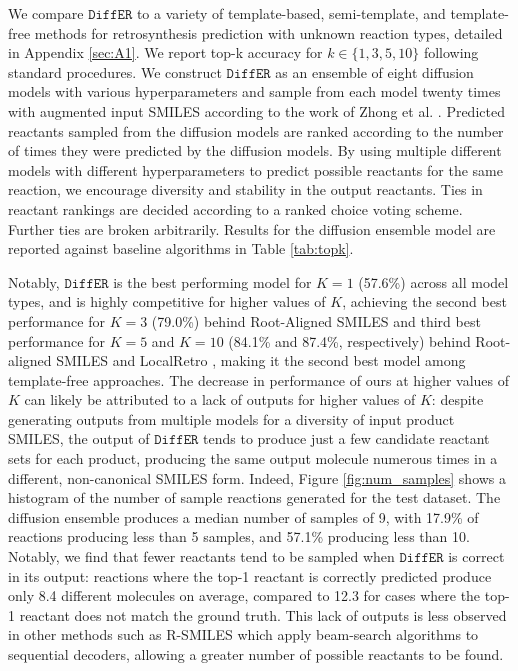 \documentclass{article}
\newcommand{\ours}{$\texttt{DiffER}$\xspace}
\begin{document}
We compare \ours to a variety of template-based, semi-template, and template-free methods for retrosynthesis prediction with unknown reaction types, detailed in Appendix \ref{sec:A1}. We report top-k accuracy for $k\in\{1,3,5,10\}$ following standard procedures. We construct \ours as an ensemble of eight diffusion models with various hyperparameters and sample from each model twenty times with augmented input SMILES according to the work of Zhong et al. \cite{zhong2022root}. Predicted reactants sampled from the diffusion models are ranked according to the number of times they were predicted by the diffusion models. By using multiple different models with different hyperparameters to predict possible reactants for the same reaction, we encourage diversity and stability in the output reactants. Ties in reactant rankings are decided according to a ranked choice voting scheme. Further ties are broken arbitrarily. Results for the diffusion ensemble model are reported against baseline algorithms in Table \ref{tab:topk}.

Notably, \ours is the best performing model for $K=1$ (57.6\%) across all model types, and is highly competitive for higher values of $K$, achieving the second best performance for $K=3$ (79.0\%) behind Root-Aligned SMILES \cite{zhong2022root} and third best performance for $K=5$ and $K=10$ (84.1\% and 87.4\%, respectively) behind Root-aligned SMILES and LocalRetro \cite{chen2021deep}, making it the second best model among template-free approaches. The decrease in performance of ours at higher values of $K$ can likely be attributed to a lack of outputs for higher values of $K$: despite generating outputs from multiple models for a diversity of input product SMILES, the output of \ours tends to produce just a few candidate reactant sets for each product, producing the same output molecule numerous times in a different, non-canonical SMILES form. Indeed, Figure \ref{fig:num_samples} shows a histogram of the number of sample reactions generated for the test dataset. The diffusion ensemble produces a median number of samples of 9, with 17.9\% of reactions producing less than 5 samples, and 57.1\% producing less than 10. Notably, we find that fewer reactants tend to be sampled when \ours is correct in its output: reactions where the top-1 reactant is correctly predicted produce only 8.4 different molecules on average, compared to 12.3 for cases where the top-1 reactant does not match the ground truth. This lack of outputs is less observed in other methods such as R-SMILES which apply beam-search algorithms to sequential decoders, allowing a greater number of possible reactants to be found. 
\end{document}
